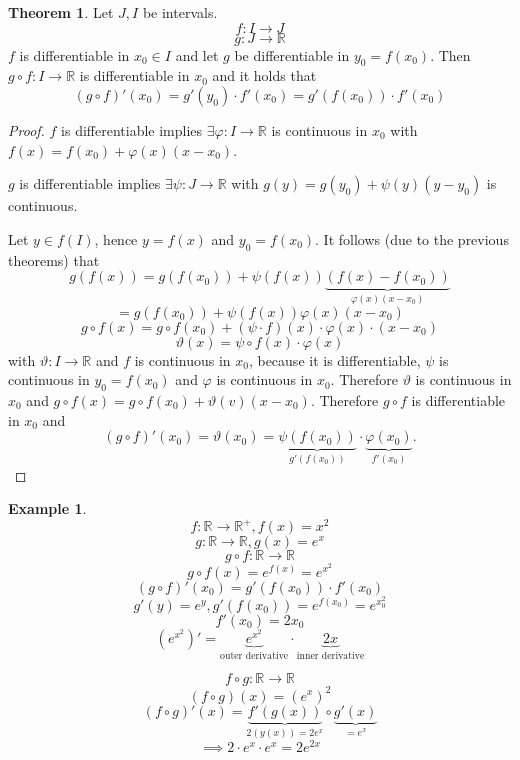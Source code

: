 \documentclass[a4paper,landscape,twocolumn]{article}
\theoremstyle{definition}
\newtheorem{theorem}{Theorem}
\newtheorem{ex}{Example}
\begin{document}
\begin{theorem}
  Let $J, I$ be intervals.
  \[ f: I \to J \]
  \[ g: J \to \mathbb R \]
  $f$ is differentiable in $x_0 \in I$ and let $g$ be differentiable in $y_0 = f(x_0)$.
  Then $g \circ f: I \to \mathbb R$ is differentiable in $x_0$ and it holds that
  \[ (g \circ f)'(x_0) = g'(y_0) \cdot f'(x_0) = g'(f(x_0)) \cdot f'(x_0) \]
\end{theorem}
\begin{proof}
  $f$ is differentiable implies $\exists \varphi: I \to \mathbb R$ is continuous
  in $x_0$ with $f(x) = f(x_0) + \varphi(x)(x - x_0)$.

  $g$ is differentiable implies $\exists \psi: J \to \mathbb R$ with $g(y) = g(y_0) + \psi(y)(y - y_0)$
  is continuous.

  Let $y \in f(I)$, hence $y = f(x)$ and $y_0 = f(x_0)$.
  It follows (due to the previous theorems) that
  \[ g(f(x)) = g(f(x_0)) + \psi(f(x))\underbrace{\left(f(x) - f(x_0)\right)}_{\varphi(x)(x - x_0)} \]
  \[ = g(f(x_0)) + \psi(f(x)) \varphi(x) (x - x_0) \]
  \[ g \circ f(x) = g \circ f(x_0) + (\psi \cdot f)(x) \cdot \varphi (x) \cdot (x - x_0) \]
  \[ \vartheta(x) = \psi \circ f(x) \cdot \varphi(x) \]
  with $\vartheta: I \to \mathbb R$ and $f$ is continuous in $x_0$, because
  it is differentiable, $\psi$ is continuous in $y_0 = f(x_0)$ and $\varphi$ is continuous in $x_0$.
  Therefore $\vartheta$ is continuous in $x_0$ and
  $g \circ f(x) = g \circ f(x_0) + \vartheta (v) (x - x_0)$.
  Therefore $g \circ f$ is differentiable in $x_0$
  and
  \[
    (g \circ f)'(x_0)
    = \vartheta(x_0)
    = \underbrace{\psi(f(x_0))}_{g'(f(x_0))} \cdot \underbrace{\varphi(x_0)}_{f'(x_0)}.
  \]
\end{proof}
%
\begin{ex}
  \[ f: \mathbb R \to \mathbb R^+, f(x) = x^2 \]
  \[ g: \mathbb R \to \mathbb R, g(x) = e^x \]
  \[ g \circ f: \mathbb R \to \mathbb R \]
  \[ g \circ f(x) = e^{f(x)} = e^{x^2} \]
  \[ (g \circ f)'(x_0) = g'(f(x_0)) \cdot f'(x_0) \]
  \[ g'(y) = e^y, g'(f(x_0)) = e^{f(x_0)} = e^{x_0^2} \]
  \[ f'(x_0) = 2x_0 \]
  \[
    (e^{x^2})' = \underbrace{e^{x^2}}_{\text{outer derivative}} \cdot
    \underbrace{2x}_{\text{inner derivative}}
  \]

  \[ f \circ g: \mathbb R \to \mathbb R \]
  \[ (f \circ g)(x) = (e^x)^2 \]
  \[ (f \circ g)'(x) = \underbrace{f'(g(x))}_{2(y(x)) = 2e^x} \circ \underbrace{g'(x)}_{=e^x} \]
  \[ \implies 2 \cdot e^x \cdot e^x = 2e^{2x} \]
\end{ex}
\end{document}
